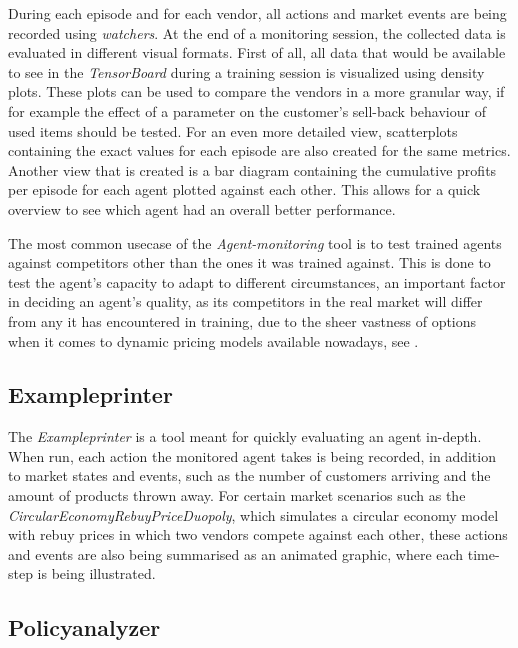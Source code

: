 During each episode and for each vendor, all actions and market events are being recorded using \emph{watchers}. At the end of a monitoring session, the collected data is evaluated in different visual formats. First of all, all data that would be available to see in the \emph{TensorBoard} during a training session is visualized using density plots. These plots can be used to compare the vendors in a more granular way, if for example the effect of a parameter on the customer's sell-back behaviour of used items should be tested. For an even more detailed view, scatterplots containing the exact values for each episode are also created for the same metrics. Another view that is created is a bar diagram containing the cumulative profits per episode for each agent plotted against each other. This allows for a quick overview to see which agent had an overall better performance.

The most common usecase of the \emph{Agent-monitoring} tool is to test trained agents against competitors other than the ones it was trained against. This is done to test the agent's capacity to adapt to different circumstances, an important factor in deciding an agent's quality, as its competitors in the real market will differ from any it has encountered in training, due to the sheer vastness of options when it comes to dynamic pricing models available nowadays, see .

\subsection*{Exampleprinter}

The \emph{Exampleprinter} is a tool meant for quickly evaluating an agent in-depth. When run, each action the monitored agent takes is being recorded, in addition to market states and events, such as the number of customers arriving and the amount of products thrown away. For certain market scenarios such as the \emph{CircularEconomyRebuyPriceDuopoly}, which simulates a circular economy model with rebuy prices in which two vendors compete against each other, these actions and events are also being summarised as an animated graphic, where each time-step is being illustrated. 

\subsection*{Policyanalyzer}

